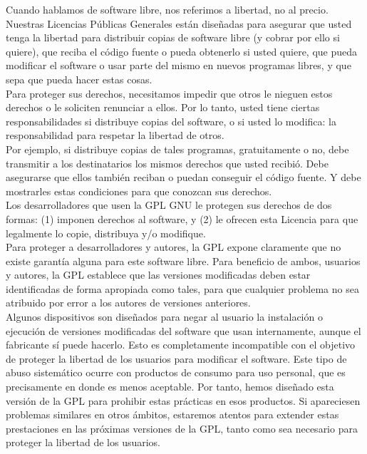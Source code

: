 Cuando hablamos de software libre, nos referimos a libertad, no al precio. Nuestras Licencias Públicas Generales están diseñadas para asegurar que usted tenga la libertad  para  distribuir  copias  de  software  libre  (y  cobrar  por  ello  si  quiere),  que reciba  el  código  fuente  o  pueda  obtenerlo  si  usted  quiere,  que  pueda  modificar  el
software o usar parte del mismo en nuevos programas libres, y que sepa que pueda hacer estas cosas.\\

Para proteger sus derechos, necesitamos impedir que otros le nieguen estos derechos o le soliciten renunciar a ellos. Por lo tanto, usted tiene ciertas responsabilidades si distribuye copias del software, o si usted lo modifica: la responsabilidad para respetar la libertad de otros.\\

Por ejemplo, si distribuye copias de tales programas, gratuitamente o no, debe transmitir a los destinatarios los mismos derechos que usted recibió. Debe asegurarse que ellos también reciban o puedan conseguir el código fuente. Y debe mostrarles estas condiciones para que conozcan sus derechos.\\

Los desarrolladores que usen la GPL GNU le protegen sus derechos de dos formas: (1) imponen derechos al software, y (2) le ofrecen esta Licencia para que legalmente lo copie, distribuya y/o modifique.\\

Para proteger a desarrolladores y autores, la GPL expone claramente que no existe  garantía  alguna  para  este  software  libre.  Para  beneficio  de  ambos,  usuarios  y autores, la GPL establece que las versiones modificadas deben estar identificadas de forma apropiada como tales, para que cualquier problema no sea atribuido por error
a los autores de versiones anteriores.\\

Algunos dispositivos son diseñados para negar al usuario la instalación o ejecución de versiones modificadas del software que usan internamente, aunque el fabricante sí puede hacerlo. Esto es completamente incompatible con el objetivo de proteger la libertad de los usuarios para modificar el software. Este tipo de abuso sistemático
ocurre con productos de consumo para uso personal, que es precisamente en donde es menos aceptable. Por tanto, hemos diseñado esta versión de la GPL para prohibir estas prácticas en esos productos. Si apareciesen problemas similares en otros ámbitos, estaremos atentos para extender estas prestaciones en las próximas versiones de la GPL, tanto como sea necesario para proteger la libertad de los usuarios.\\

